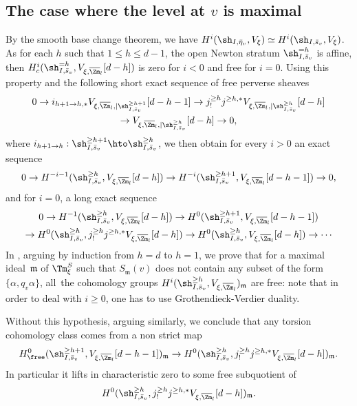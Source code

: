 \subsection{The case where the level at $v$ is maximal}
\label{para-max}

By the smooth base change theorem, we have
$H^i(\sh_{I,\bar \eta_v}, V_\xi) \simeq H^i(\sh_{I,\bar s_v},V_\xi)$.
As for each $h$ such that $1 \leq h \leq d-1$, the open Newton stratum $\sh^{=h}_{I,\bar s_v}$ is affine,
then $H^i_c(\sh^{=h}_{I,\bar s_v},V_{\xi,\overline \Zm_l}[d-h])$ is zero for $i<0$ and free for $i=0$.
Using this property and the following short exact sequence
of free perverse sheaves
\begin{multline*}
0 \to i_{h+1 \to h,*} V_{\xi,\overline \Zm_l,|\sh_{I,\bar s_v}^{\geq h+1}}[d-h-1] \to
j^{\geq h}_! j^{\geq h,*} V_{\xi,\overline \Zm_l,|\sh^{\geq h}_{I,\bar s_v}}[d-h] \\ \to
V_{\xi,\overline \Zm_l,|\sh^{\geq h}_{I,\bar s_v}}[d-h] \to 0,
\end{multline*}
where $i_{h+1 \to h}: \sh_{I,\bar s_v}^{\geq h+1} \hto
\sh_{I,\bar s_v}^{\geq h}$,
we then obtain for every $i>0$ an exact sequence
\begin{equation} \label{eq-sec}
0 \to H^{-i-1}(\sh^{\geq h}_{I,\bar s_v},V_{\xi,\overline \Zm_l}[d-h]) \to
H^{-i}(\sh^{\geq h+1}_{I,\bar s_v},V_{\xi,\overline \Zm_l}[d-h-1]) \to 0,
\end{equation}
and for $i=0$, a long exact sequence
\begin{multline} \label{eq-sec0}
0 \to H^{-1}(\sh^{\geq h}_{I,\bar s_v},V_{\xi,\overline \Zm_l}[d-h]) \to
H^{0}(\sh^{\geq h+1}_{I,\bar s_v},V_{\xi,\overline \Zm_l}[d-h-1])\\
\to H^0(\sh^{\geq h}_{I,\bar s_v},j^{\geq h}_! j^{\geq h,*} V_{\xi,\overline \Zm_l}[d-h]) \to
H^{0}(\sh^{\geq h}_{I,\bar s_v},V_{\xi,\overline \Zm_l}[d-h]) \to \cdots
\end{multline}
In \cite{boyer-imj}, arguing by induction from $h=d$ to $h=1$, we prove that for a maximal
ideal~$\mathfrak m$ of $\Tm^S_{\xi}$ such that $S_{\mathfrak m}(v)$ does not contain any subset
of the form $\{\alpha,q_v \alpha\}$, all~the cohomology groups
$H^i(\sh_{I,\bar s_v}^{\geq h},V_{\xi,\overline \Zm_l})_{\mathfrak m}$ are free: note that in order
to deal with $i\geq 0$, one has to use Grothendieck-Verdier duality.

Without this hypothesis, arguing similarly, we conclude that any torsion cohomology class
comes from a non strict map
\begin{equation} \label{eq-map-strict-fini}
H^{0}_{\free}(\sh^{\geq h+1}_{I,\bar s_v},V_{\xi,\overline \Zm_l}[d-h-1])_{\mathfrak m} \to
H^0(\sh^{\geq h}_{I,\bar s_v},j^{\geq h}_! j^{\geq h,*} V_{\xi,\overline \Zm_l}[d-h])_{\mathfrak m}.
\end{equation}
In particular it lifts in characteristic zero to some free subquotient of
\[
H^0(\sh^{\geq h}_{I,\bar s_v},j^{\geq h}_! j^{\geq h,*} V_{\xi,\overline \Zm_l}[d-h])_{\mathfrak m}.
\]


